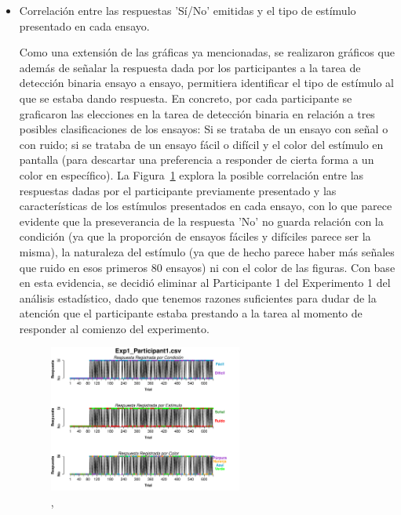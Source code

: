 \begin{itemize}
\item Correlación entre las respuestas 'Sí/No' emitidas y el tipo de estímulo presentado en cada ensayo.

Como una extensión de las gráficas ya mencionadas, se realizaron gráficos que además de señalar la respuesta dada por los participantes a la tarea de detección binaria ensayo a ensayo, permitiera identificar el tipo de estímulo al que se estaba dando respuesta. En concreto, por cada participante se graficaron las elecciones en la tarea de detección binaria en relación a tres posibles clasificaciones de los ensayos: Si se trataba de un ensayo con señal o con ruido; si se trataba de un ensayo fácil o difícil y el color del estímulo en pantalla (para descartar una preferencia a responder de cierta forma a un color en específico). La Figura~\ref{fig:BiasResp_E1_P1} explora la posible correlación entre las respuestas dadas por el participante previamente presentado y las características de los estímulos presentados en cada ensayo, con lo que parece evidente que la preseverancia de la respuesta 'No' no guarda relación con la condición (ya que la proporción de ensayos fáciles y difíciles parece ser la misma), la naturaleza del estímulo (ya que de hecho parece haber más señales que ruido en esos primeros 80 ensayos) ni con el color de las figuras. Con base en esta evidencia, se decidió eliminar al Participante 1 del Experimento 1 del análisis estadístico, dado que tenemos razones suficientes para dudar de la atención que el participante estaba prestando a la tarea al momento de responder al comienzo del experimento.\\

\begin{figure}[th]
\centering
\includegraphics[width=0.60\textwidth]{Figures/BiasResp_Exp1_P1} 
\caption[ParticipanteSesgado_Variables]{,}
\label{fig:BiasResp_E1_P1}
\end{figure}


\end{itemize}

